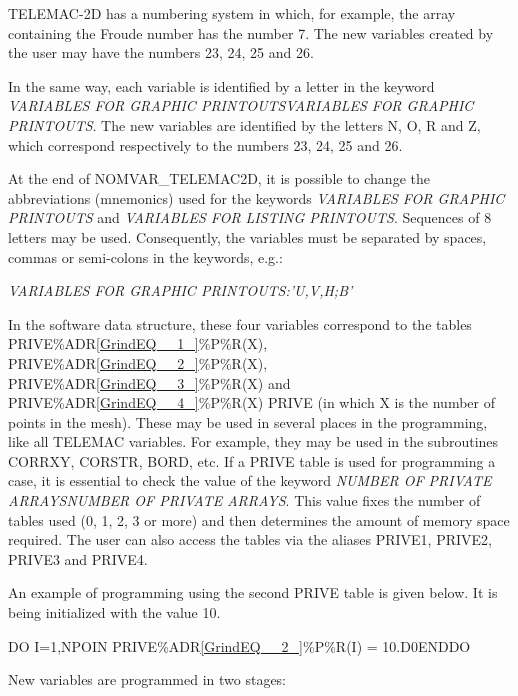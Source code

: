 \documentclass{article} %
\begin{document}
 TELEMAC-2D has a numbering system in which, for example, the array containing the Froude number has the number 7. The new variables created by the user may have the numbers 23, 24, 25 and 26.

 In the same way, each variable is identified by a letter in the keyword \textit{VARIABLES FOR GRAPHIC PRINTOUTSVARIABLES FOR GRAPHIC PRINTOUTS}. The new variables are identified by the letters N, O, R and Z, which correspond respectively to the numbers 23, 24, 25 and 26.

 At the end of NOMVAR\_TELEMAC2D, it is possible to change the abbreviations (mnemonics) used for the keywords \textit{VARIABLES FOR GRAPHIC PRINTOUTS} and \textit{VARIABLES FOR LISTING PRINTOUTS}. Sequences of 8 letters may be used. Consequently, the variables must be separated by spaces, commas or semi-colons in the keywords, e.g.:

 \textit{VARIABLES FOR GRAPHIC PRINTOUTS:'U,V,H;B'}

 In the software data structure, these four variables correspond to the tables PRIVE\%ADR\eqref{GrindEQ__1_}\%P\%R(X), PRIVE\%ADR\eqref{GrindEQ__2_}\%P\%R(X), PRIVE\%ADR\eqref{GrindEQ__3_}\%P\%R(X) and PRIVE\%ADR\eqref{GrindEQ__4_}\%P\%R(X) PRIVE (in which X is the number of points in the mesh). These may be used in several places in the programming, like all TELEMAC variables. For example, they may be used in the subroutines CORRXY, CORSTR, BORD, etc. If a PRIVE table is used for programming a case, it is essential to check the value of the keyword \textit{NUMBER OF PRIVATE ARRAYSNUMBER OF PRIVATE ARRAYS}. This value fixes the number of tables used (0, 1, 2, 3 or more) and then determines the amount of memory space required. The user can also access the tables via the aliases PRIVE1, PRIVE2, PRIVE3 and PRIVE4.

 An example of programming using the second PRIVE table is given below. It is being initialized with the value 10.

 DO I=1,NPOIN   PRIVE\%ADR\eqref{GrindEQ__2_}\%P\%R(I) = 10.D0ENDDO

 New variables are programmed in two stages:
\end{document}
